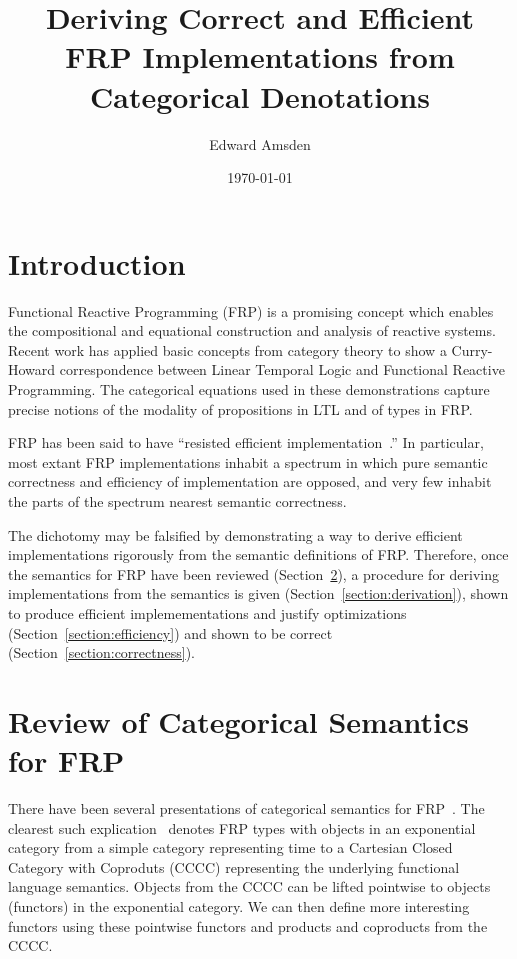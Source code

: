 \documentclass{article}
\title{Deriving Correct and Efficient FRP Implementations from Categorical Denotations}
\author{Edward Amsden}
\date{\today}
\begin{document}
\maketitle

\section{Introduction}

Functional Reactive Programming (FRP) is a promising concept which enables the compositional and equational construction and analysis of reactive systems. Recent work has applied basic concepts from category theory to show a Curry-Howard correspondence between Linear Temporal Logic and Functional Reactive Programming. The categorical equations used in these demonstrations capture precise notions of the modality of propositions in LTL and of types in FRP.

FRP has been said to have ``resisted efficient implementation~\cite{Elliot}.'' In particular, most extant FRP implementations inhabit a spectrum in which pure semantic correctness and efficiency of implementation are opposed, and very few inhabit the parts of the spectrum nearest semantic correctness.

The dichotomy may be falsified by demonstrating a way to derive efficient implementations rigorously from the semantic definitions of FRP. Therefore, once the semantics for FRP have been reviewed (Section~\ref{section:semantics}), a procedure for deriving implementations from the semantics is given (Section~\ref{section:derivation}), shown to produce efficient implemementations and justify optimizations (Section~\ref{section:efficiency}) and shown to be correct (Section~\ref{section:correctness}).

\section{Review of Categorical Semantics for FRP}
\label{section:semantics}
There have been several presentations of categorical semantics for FRP~\cite{Jeffrey,Krishnaswami}. The clearest such explication~\cite{Jeltsch} denotes FRP types with objects in an exponential category from a simple category representing time to a Cartesian Closed Category with Coproduts (CCCC) representing the underlying functional language semantics. Objects from the CCCC can be lifted pointwise to objects (functors) in the exponential category. We can then define more interesting functors using these pointwise functors and products and coproducts from the CCCC. 
\end{document}
